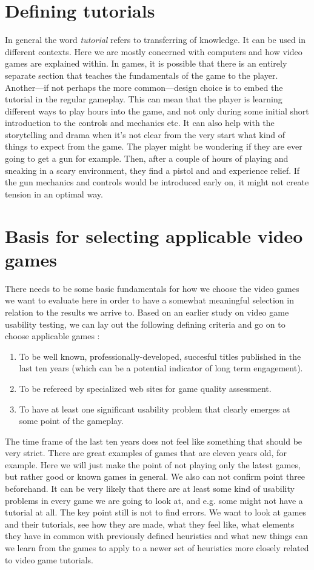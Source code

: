 \section{Defining tutorials}
In general the word \textit{tutorial} refers to transferring of knowledge. It can be used in different contexts. Here we are mostly concerned with computers and how video games are explained within. In games, it is possible that there is an entirely separate section that teaches the fundamentals of the game to the player. Another---if not perhaps the more common---design choice is to embed the tutorial in the regular gameplay. This can mean that the player is learning different ways to play hours into the game, and not only during some initial short introduction to the controls and mechanics etc. It can also help with the storytelling and drama when it's not clear from the very start what kind of things to expect from the game. The player might be wondering if they are ever going to get a gun for example. Then, after a couple of hours of playing and sneaking in a scary environment, they find a pistol and and experience relief. If the gun mechanics and controls would be introduced early on, it might not create tension in an optimal way.

\section{Basis for selecting applicable video games}
There needs to be some basic fundamentals for how we choose the video games we want to evaluate here in order to have a somewhat meaningful selection in relation to the results we arrive to. Based on an earlier study on video game usability testing, we can lay out the following defining criteria and go on to choose applicable games \cite{Febretti2009a}:
\begin{enumerate}
	\item To be well known, professionally-developed, succesful titles published in the last ten years (which can be a potential indicator of long term engagement).
	\item To be refereed by specialized web sites for game quality assessment.
	\item To have at least one significant usability problem that clearly emerges at some point of the gameplay.
\end{enumerate}

The time frame of the last ten years does not feel like something that should be very strict. There are great examples of games that are eleven years old, for example. Here we will just make the point of not playing only the latest games, but rather good or known games in general. We also can not confirm point three beforehand. It can be very likely that there are at least some kind of usability problems in every game we are going to look at, and e.g. some might not have a tutorial at all. The key point still is not to find errors. We want to look at games and their tutorials, see how they are made, what they feel like, what elements they have in common with previously defined heuristics and what new things can we learn from the games to apply to a newer set of heuristics more closely related to video game tutorials.